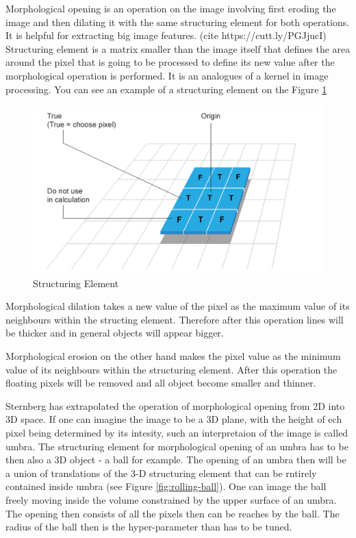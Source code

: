 Morphological opening is an operation on the image involving first eroding the image and then dilating it with the same structuring element for both operations. It is helpful for extracting big image features. (cite https://cutt.ly/PGJjucI) Structuring element is a matrix smaller than the image itself that defines the area around the pixel that is going to be processed to define its new value after the morphological operation is performed. It is an analogues of a kernel in image processing. You can see an example of a structuring element on the Figure \ref{fig:structuring-element}

\begin{figure}[htb]
	\begin{center}
		\includegraphics[width=0.5\linewidth]{bilder/structuring-element.png}
		\caption{Structuring Element}\label{fig:structuring-element}
	\end{center}
\end{figure}

Morphological dilation takes a new value of the pixel as the maximum value of its neighbours within the structing element. Therefore after this operation lines will be thicker and in general objects will appear bigger.

Morphological erosion on the other hand makes the pixel value as the minimum value of its neighbours within the structuring element. After this operation the floating pixels will be removed and all object become smaller and thinner.

Sternberg has extrapolated the operation of morphological opening from 2D into 3D space. If one can imagine the image to be a 3D plane, with the height of ech pixel being determined by its intesity, such an interpretaion of the image is called umbra. The structuring element for morphological opening of an umbra has to be then also a 3D object - a ball for example. The opening of an umbra then will be a union of translations of the 3-D structuring element that can be rntirely contained inside umbra (see Figure \ref{fig:rolling-ball}). One can image the ball freely moving inside the volume constrained by the upper surface of an umbra. The opening then consists of all the pixels then can be reaches by the ball. The radius of the ball then is the hyper-parameter than has to be tuned. 

